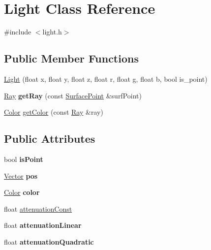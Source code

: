 \hypertarget{class_light}{}\section{Light Class Reference}
\label{class_light}


{\ttfamily \#include $<$light.\+h$>$}

\subsection*{Public Member Functions}
\begin{DoxyCompactItemize}
\item 
\mbox{\hyperlink{class_light_a69ca971ea95f41b226e12e02094ba1f2}{Light}} (float x, float y, float z, float r, float g, float b, bool is\+\_\+point)
\item 
\mbox{\label{class_light_acfc5fe7c64a270977b3a5a2e53a0fb9c}} 
\mbox{\hyperlink{class_ray}{Ray}} {\bfseries get\+Ray} (const \mbox{\hyperlink{class_surface_point}{Surface\+Point}} \&surf\+Point)
\item 
\mbox{\hyperlink{class_color}{Color}} \mbox{\hyperlink{class_light_a0fb5b95b28c59924030681c0d2646e87}{get\+Color}} (const \mbox{\hyperlink{class_ray}{Ray}} \&ray)
\end{DoxyCompactItemize}
\subsection*{Public Attributes}
\begin{DoxyCompactItemize}
\item 
\mbox{\label{class_light_a88ff3e89ced966a6a882ac57483b500b}} 
bool {\bfseries is\+Point}
\item 
\mbox{\label{class_light_a48927a23d97db2c956d0b206fbe06be2}} 
\mbox{\hyperlink{struct_vector}{Vector}} {\bfseries pos}
\item 
\mbox{\label{class_light_ad7a168d26aed1bf7cca1a8d8e6f8ada4}} 
\mbox{\hyperlink{class_color}{Color}} {\bfseries color}
\item 
float \mbox{\hyperlink{class_light_a27af00db907fd279ba3e342d6c5ec8c2}{attenuation\+Const}}
\item 
\mbox{\label{class_light_a6fe2e610682fa03bdb3d5a3036c0ec4a}} 
float {\bfseries attenuation\+Linear}
\item 
\mbox{\label{class_light_a1208ffdf5fd52614c5fd2b6ea787921c}} 
float {\bfseries attenuation\+Quadratic}
\end{DoxyCompactItemize}



